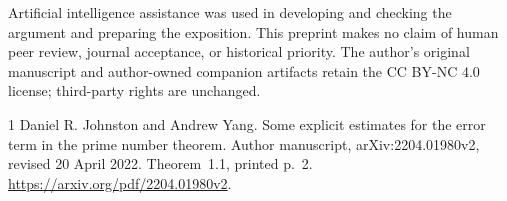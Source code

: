 \documentclass[11pt]{article}
\theoremstyle{remark}
\numberwithin{equation}{section}
\begin{document}
Artificial intelligence assistance was used in developing and checking the argument and preparing the exposition. This preprint makes no claim of human peer review, journal acceptance, or historical priority. The author's original manuscript and author-owned companion artifacts retain the CC BY-NC 4.0 license; third-party rights are unchanged.

\begin{thebibliography}{1}
Daniel R. Johnston and Andrew Yang.
\newblock Some explicit estimates for the error term in the prime number theorem.
\newblock Author manuscript, arXiv:2204.01980v2, revised 20 April 2022.
\newblock Theorem~1.1, printed p.~2.
\newblock \url{https://arxiv.org/pdf/2204.01980v2}.
\end{thebibliography}
\end{document}
